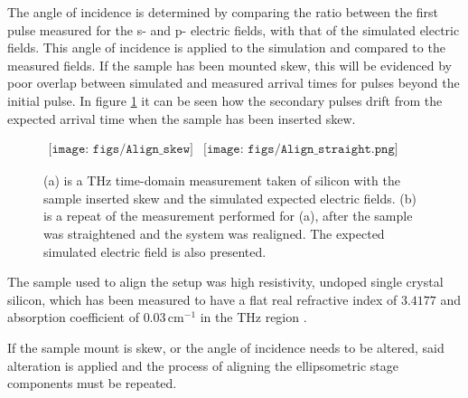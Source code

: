 The angle of incidence is determined by comparing the ratio between the first pulse measured for the s- and p- electric fields, with that of the simulated electric fields. This angle of incidence is applied to the simulation and compared to the measured fields. If the sample has been mounted skew, this will be evidenced by poor overlap between simulated and measured arrival times for pulses beyond the initial pulse. In figure \ref{fig:Align_skew} it can be seen how the secondary pulses drift from the expected arrival time when the sample has been inserted skew.

\begin{figure}[H]
                \begin{center}$
								\begin{array}{cc}
                \texttt{[image: figs/Align\_skew]}&
                \texttt{[image: figs/Align\_straight.png]}
								\end{array}$
								\end{center}
	\caption[Example of straightening the sample]{(a) is a THz time-domain measurement taken of silicon with the sample inserted skew and the simulated expected electric fields. (b) is a repeat of the measurement performed for (a), after the sample was straightened and the system was realigned. The expected simulated electric field is also presented.}
	\label{fig:Align_skew}
\end{figure}

The sample used to align the setup was high resistivity, undoped single crystal silicon, which has been measured to have a flat real refractive index of $3.4177$ and absorption coefficient of $0.03\,\text{cm}^{-1}$ in the THz region \cite{Li-2008, Jepsen-2007, Grischkowsky1990}.

If the sample mount is skew, or the angle of incidence needs to be altered, said alteration is applied and the process of aligning the ellipsometric stage components must be repeated.

\endinput